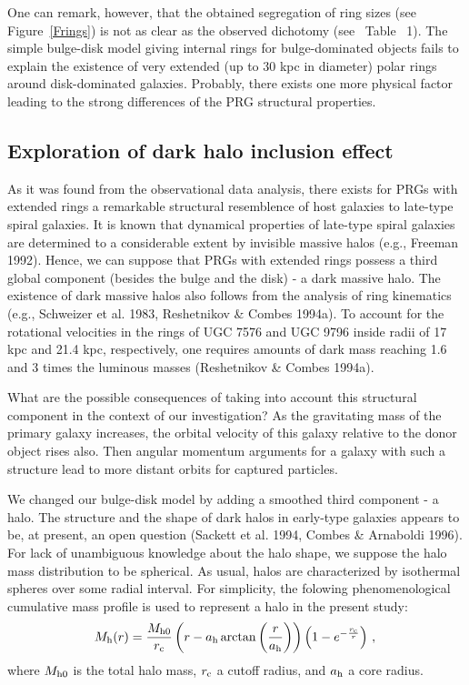 One can remark, however, that the obtained segregation of ring 
sizes (see~ Figure~\ref{Frings}) is not as clear as the observed 
dichotomy (see~ Table~ 1). The simple 
bulge-disk model giving internal rings for bulge-dominated objects 
fails to explain the existence of very extended (up to 30 kpc in diameter) 
polar rings around disk-dominated galaxies. Probably, there exists one 
more physical factor leading to the strong differences of the PRG 
structural properties.

\subsection{Exploration of dark halo inclusion effect}

As it was found from the observational data analysis, 
there exists for PRGs with extended rings 
a remarkable structural resemblence of host galaxies 
to late-type spiral galaxies. 
It is known that dynamical properties of 
late-type spiral galaxies are determined to a considerable extent 
by invisible massive halos (e.g., Freeman 1992). 
Hence, we can suppose that PRGs with extended rings possess a third 
global component (besides the bulge and the disk) - a dark massive halo. 
The existence of dark massive halos also follows from the analysis 
of ring kinematics (e.g., Schweizer et al. 1983, Reshetnikov \& Combes 1994a). 
To account 
for the rotational velocities in the rings of UGC 7576 and UGC 9796 inside 
radii of 17 kpc and 21.4 kpc, respectively, one requires amounts of dark mass 
reaching 1.6 and 3 times the luminous masses (Reshetnikov 
\& Combes 1994a).

What are the possible consequences of taking into account this 
structural component in the context of our investigation? As 
the gravitating mass of the primary galaxy increases, 
the orbital velocity of this galaxy relative to the donor object 
rises also. Then angular momentum arguments for a galaxy with 
such a structure lead to more distant orbits for captured 
particles. 

We changed our bulge-disk model 
by adding a smoothed third component - a halo. 
The structure and the shape of dark halos in early-type galaxies 
appears to be, at present, an open question 
(Sackett et al. 1994, Combes \& Arnaboldi 1996). For lack 
of unambiguous knowledge about the halo shape, we suppose the 
halo mass distribution to be spherical. As usual,  
halos are characterized by isothermal spheres over some radial 
interval. For simplicity, the folowing phenomenological cumulative 
mass profile is used to represent a halo in the present study:
\begin{equation}
M_{\rm h}(r) = \frac{M_{{\rm h}0}}{r_{\rm c}}\left(r-a_{\rm h} 
\arctan\left(\frac{r}{a_{\rm h}}\right)\right)
\left(1-e^{- \frac{r_{\rm c}}{r}}\right) \, ,\\
\label{halo}
\end{equation} 
where $M_{{\rm h}0}$ is the total halo mass, $r_{\rm c}$ a 
cutoff radius, and $a_{\rm h}$ a core radius. 

